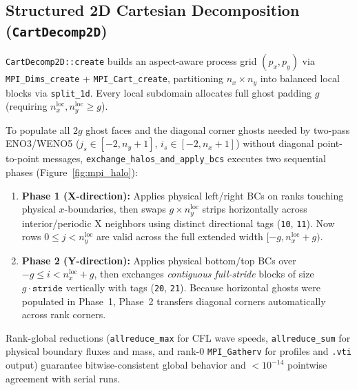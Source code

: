 \documentclass[11pt,a4paper]{article}
\theoremstyle{definition}
\newcommand{\code}[1]{\texttt{#1}}
\begin{document}
\subsection{Structured 2D Cartesian Decomposition (\code{CartDecomp2D})}

\code{CartDecomp2D::create} builds an aspect-aware process grid $(p_x, p_y)$ via \code{MPI\_Dims\_create} + \code{MPI\_Cart\_create}, partitioning $n_x\times n_y$ into balanced local blocks via \code{split\_1d}. Every local subdomain allocates full ghost padding $g$ (requiring $n_x^{\text{loc}}, n_y^{\text{loc}} \ge g$).

To populate all $2g$ ghost faces and the diagonal corner ghosts needed by two-pass ENO3/WENO5 ($j_s \in [-2, n_y+1]$, $i_s \in [-2, n_x+1]$) without diagonal point-to-point messages, \code{exchange\_\allowbreak halos\_\allowbreak and\_\allowbreak apply\_\allowbreak bcs} executes two sequential phases (Figure~\ref{fig:mpi_halo}):
\begin{enumerate}
\item \textbf{Phase 1 (X-direction):} Applies physical left/right BCs on ranks touching physical $x$-boundaries, then swaps $g\times n_y^{\text{loc}}$ strips horizontally across interior/periodic X neighbors using distinct directional tags (\code{10}, \code{11}). Now rows $0\le j<n_y^{\text{loc}}$ are valid across the full extended width $[-g, n_x^{\text{loc}}+g)$.
\item \textbf{Phase 2 (Y-direction):} Applies physical bottom/top BCs over $-g \le i < n_x^{\text{loc}} + g$, then exchanges \emph{contiguous full-stride} blocks of size $g \cdot \code{stride}$ vertically with tags (\code{20}, \code{21}). Because horizontal ghosts were populated in Phase~1, Phase~2 transfers diagonal corners automatically across rank corners.
\end{enumerate}
Rank-global reductions (\code{allreduce\_max} for CFL wave speeds, \code{allreduce\_sum} for physical boundary fluxes and mass, and rank-0 \code{MPI\_Gatherv} for profiles and \code{.vti} output) guarantee bitwise-consistent global behavior and $<10^{-14}$ pointwise agreement with serial runs.
\end{document}
